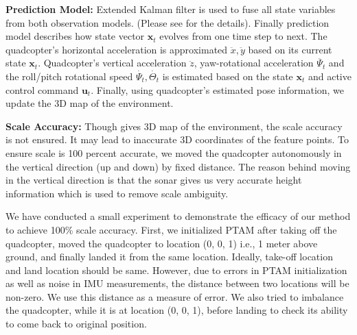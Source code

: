 \textbf{Prediction Model:} Extended Kalman filter is used to fuse all state
variables from both observation models. (Please see \cite{engel} for the
details). Finally prediction model describes how state vector $\mathbf{x}_t$
evolves from one time step to next. The quadcopter’s horizontal acceleration is
approximated $\ddot{x}, \ddot{y}$ based on its current state $\mathbf{x}_t$.
Quadcopter's vertical acceleration   $\ddot{z}$, yaw-rotational 
acceleration $\ddot{{\Psi}_t}$ and the roll/pitch rotational speed
$\dot{{\Psi}_t}, \dot{{\Theta}_t}$ is estimated based on the state
$\mathbf{x}_t$ and  active control command $\mathbf{u}_t$. Finally, using quadcopter's 
estimated pose information, we update the 3D map of the environment.

\noindent\textbf{Scale Accuracy:} 
Though \cite{engel}  gives 3D map of the environment, the scale accuracy is not
ensured. It may lead to inaccurate 3D coordinates of the feature points. To
ensure scale is 100 percent accurate, we moved the quadcopter autonomously in
the vertical direction (up and down) by fixed distance. The reason behind moving in
the vertical direction is that the sonar gives us very accurate height information 
which is used to remove scale ambiguity.

We have conducted a small experiment to demonstrate the efficacy of our method to
achieve 100\% scale accuracy. First, we initialized PTAM after
taking off the quadcopter, moved the quadcopter to location (0, 0, 1) i.e., 1
meter above ground, and finally landed it from the same location. Ideally,
take-off location and land location should be same. However, due to errors in
PTAM initialization as well as noise in IMU measurements, the distance between
two locations will be non-zero. We use this distance as a measure of error. We also tried to imbalance the quadcopter, while it is at location (0, 0, 1), before landing to check its
ability to come back to original position.

